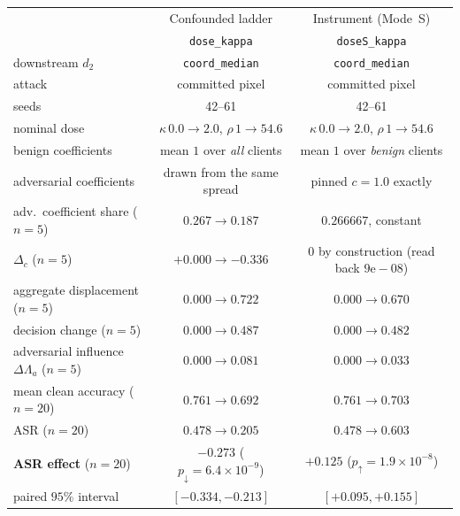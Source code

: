\documentclass{article}
\begin{document}
\begin{table}[t]
\label{tab:comparability}
\begin{tabular}{lcc}
\toprule
& Confounded ladder & Instrument (Mode~S) \\
& \texttt{dose\_kappa} & \texttt{doseS\_kappa} \\
\midrule
downstream $d_2$ & \texttt{coord\_median} & \texttt{coord\_median} \\
attack & committed pixel & committed pixel \\
seeds & 42--61 & 42--61 \\
nominal dose & $\kappa\,0.0\!\to\!2.0$, $\rho\,1\!\to\!54.6$ & $\kappa\,0.0\!\to\!2.0$, $\rho\,1\!\to\!54.6$ \\
\midrule
benign coefficients & mean $1$ over \emph{all} clients & mean $1$ over \emph{benign} clients \\
adversarial coefficients & drawn from the same spread & pinned $c=1.0$ exactly \\
adv.\ coefficient share ($n{=}5$) & $0.267 \to \mathbf{0.187}$ & $0.266667$, constant \\
$\Delta_c$ ($n{=}5$) & $+0.000 \to \mathbf{-0.336}$ & $0$ by construction (read back $9\mathrm{e}{-}08$) \\
\midrule
aggregate displacement ($n{=}5$) & $0.000 \to 0.722$ & $0.000 \to 0.670$ \\
decision change ($n{=}5$) & $0.000 \to 0.487$ & $0.000 \to 0.482$ \\
adversarial influence $\Delta\Lambda_a$ ($n{=}5$) & $0.000 \to \mathbf{0.081}$ & $0.000 \to \mathbf{0.033}$ \\
mean clean accuracy ($n{=}20$) & $0.761 \to 0.692$ & $0.761 \to 0.703$ \\
ASR ($n{=}20$) & $0.478 \to 0.205$ & $0.478 \to 0.603$ \\
\midrule
\textbf{ASR effect} ($n{=}20$) & $\mathbf{-0.273}$ ($p_{\downarrow}=6.4{\times}10^{-9}$) & $\mathbf{+0.125}$ ($p_{\uparrow}=1.9{\times}10^{-8}$) \\
\quad paired $95\%$ interval & ${[-0.334,-0.213]}$ & ${[+0.095,+0.155]}$ \\
\bottomrule
\end{tabular}
\end{table}
\end{document}
